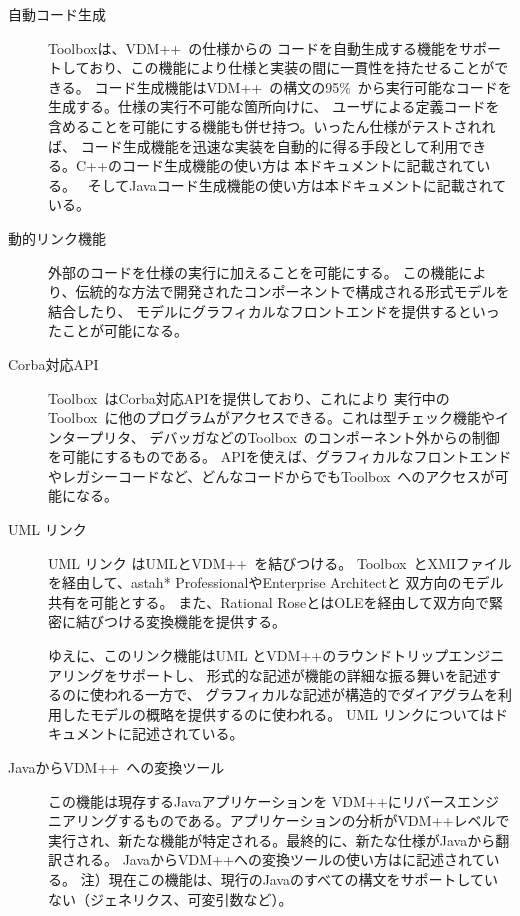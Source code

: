\documentclass[\pformat,12pt]{jarticle}
\def\vdmpp{{\small VDM}++}
\newcommand{\vdmslpp}{VDM++}
\newcommand{\Toolbox}{Toolbox}
\begin{document}
\begin{description}
\item[自動コード生成] Toolboxは、\vdmslpp\ の仕様からの
コードを自動生成する機能をサポートしており、この機能により仕様と実装の間に一貫性を持たせることができる。
コード生成機能は\vdmslpp\ の構文の95\%\ から実行可能なコードを生成する。仕様の実行不可能な箇所向けに、
ユーザによる定義コードを含めることを可能にする機能も併せ持つ。いったん仕様がテストされれば、
コード生成機能を迅速な実装を自動的に得る手段として利用できる。C++のコード生成機能の使い方は
本ドキュメントに記載されている。
\ そしてJavaコード生成機能の使い方は本ドキュメント\cite{CGJavaManPP-SCSK}に記載されている。

\item[動的リンク機能] 外部のコードを仕様の実行に加えることを可能にする。
この機能により、伝統的な方法で開発されたコンポーネントで構成される形式モデルを結合したり、
モデルにグラフィカルなフロントエンドを提供するといったことが可能になる。

\item[Corba対応API] \Toolbox\ はCorba対応APIを提供しており、これにより
実行中の\Toolbox\ に他のプログラムがアクセスできる。これは型チェック機能やインタープリタ、
デバッガなどの\Toolbox\ のコンポーネント外からの制御を可能にするものである。
APIを使えば、グラフィカルなフロントエンドやレガシーコードなど、どんなコードからでも\Toolbox\ 
へのアクセスが可能になる。

\item[UML リンク] UML リンク はUMLと\vdmpp\ を結びつける。
\Toolbox\ とXMIファイルを経由して、astah* ProfessionalやEnterprise Architectと
双方向のモデル共有を可能とする。
また、Rational RoseとはOLEを経由して双方向で緊密に結びつける変換機能を提供する。

ゆえに、このリンク機能はUML と\vdmpp のラウンドトリップエンジニアリングをサポートし、
形式的な記述が機能の詳細な振る舞いを記述するのに使われる一方で、
グラフィカルな記述が構造的でダイアグラムを利用したモデルの概略を提供するのに使われる。
UML リンクについてはドキュメント\cite{UMLMan-SCSK}に記述されている。

\item[Javaから\vdmpp\ への変換ツール] この機能は現存するJavaアプリケーションを
\vdmpp にリバースエンジニアリングするものである。アプリケーションの分析が\vdmpp レベルで
実行され、新たな機能が特定される。最終的に、新たな仕様がJavaから翻訳される。
Javaから\vdmpp への変換ツールの使い方は\cite{Java2VDMMan-SCSK}に記述されている。
注）現在この機能は、現行のJavaのすべての構文をサポートしていない（ジェネリクス、可変引数など）。

\end{description}
\end{document}
